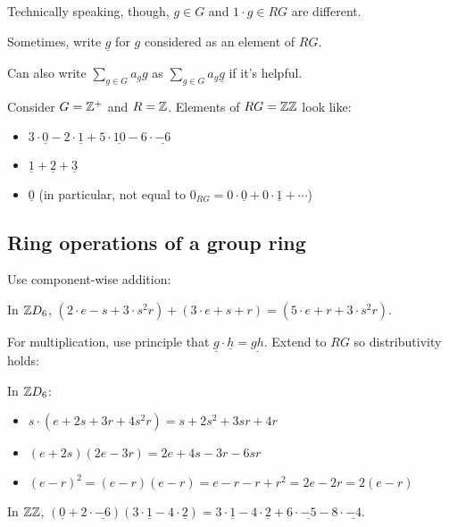 \documentclass[12pt,letterpaper]{report}
\begin{document}
Technically speaking, though, $g \in G$ and $1 \cdot g \in RG$ are different.

Sometimes, write $\underline{g}$ for $g$ considered as an element of $RG$.

Can also write $\sum_{g \in G} a_g g$ as $\sum_{g \in G} a_g \underline{g}$ if it's helpful.

\begin{ex}
  Consider $G = \mathbb{Z}^+$ and $R = \mathbb{Z}$.
  Elements of $RG = \mathbb{Z}\mathbb{Z}$ look like:
  \begin{itemize}
    \item $3 \cdot \underline{0} - 2 \cdot \underline{1} + 5 \cdot \underline{10}
      - 6 \cdot \underline{-6}$
    \item $\underline{1} + \underline{2} + \underline{3}$
    \item $\underline{0}$ (in particular, not equal to
      $0_{RG} = 0 \cdot \underline{0} + 0 \cdot \underline{1} + \cdots$)
  \end{itemize}
\end{ex}

\pagebreak
\subsection{Ring operations of a group ring}

Use component-wise addition:

\begin{ex}
  In $\mathbb{Z} D_6$, $(2 \cdot e - s + 3 \cdot s^2r) + (3 \cdot e + s + r)
    = (5 \cdot e + r + 3 \cdot s^2r)$.
\end{ex}

For multiplication, use principle that $\underline{g} \cdot \underline{h} = \underline{gh}$.
Extend to $RG$ so distributivity holds:

\begin{ex}
  In $\mathbb{Z} D_6$:
  \begin{itemize}
    \item $s \cdot (e + 2s + 3r + 4s^2r) = s + 2s^2 + 3sr + 4r$
    \item $(e + 2s)(2e - 3r) = 2e + 4s - 3r - 6sr$
    \item $(e - r)^2 = (e - r)(e - r) = e - r - r + r^2 = 2e - 2r = 2(e - r)$
  \end{itemize}
\end{ex}

\begin{ex}
  In $\mathbb{Z}\mathbb{Z}$,
  $(\underline{0} + 2 \cdot \underline{-6})(3 \cdot \underline{1} - 4 \cdot \underline{2})
    = 3 \cdot \underline{1} - 4 \cdot \underline{2} + 6 \cdot \underline{-5}
    - 8 \cdot \underline{-4}$.
\end{ex}
\end{document}

